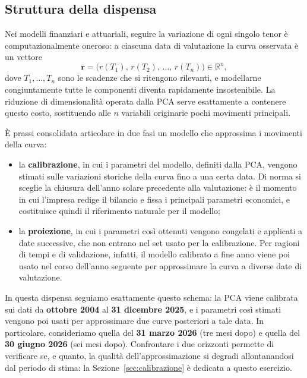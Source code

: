 \documentclass[11pt,a4paper]{article}
\theoremstyle{plain}
\theoremstyle{definition}
\theoremstyle{remark}
\begin{document}


\subsection{Struttura della dispensa}
\label{sec:calibrazione-validazione}

Nei modelli finanziari e attuariali, seguire la variazione di ogni singolo
tenor è computazionalmente oneroso: a ciascuna data di valutazione la curva
osservata è un vettore
\[
  \mathbf{r} = \big(r(T_1),\, r(T_2),\, \ldots,\, r(T_n)\big) \in \mathbb{R}^n,
\]
dove $T_1, \ldots, T_n$ sono le scadenze che si ritengono rilevanti, e
modellarne congiuntamente tutte le componenti diventa rapidamente
insostenibile. La riduzione di dimensionalità operata dalla PCA serve
esattamente a contenere questo costo, sostituendo alle $n$ variabili
originarie pochi movimenti principali.

È prassi consolidata articolare in due fasi un modello che approssima i
movimenti della curva:
\begin{itemize}
  \item la \textbf{calibrazione}, in cui i parametri del modello, definiti dalla PCA, vengono stimati sulle variazioni storiche
        della curva fino a una certa data. Di norma si sceglie la chiusura
        dell'anno solare precedente alla valutazione: è il momento in cui
        l'impresa redige il bilancio e fissa i principali parametri
        economici, e costituisce quindi il riferimento naturale per il
        modello;
  \item la \textbf{proiezione}, in cui i parametri così ottenuti vengono
        congelati e applicati a date successive, che non entrano nel set usato per la calibrazione. 
	Per ragioni di tempi e di validazione, infatti, il
        modello calibrato a fine anno viene poi usato nel corso dell'anno
        seguente per approssimare la curva a diverse date di valutazione.
\end{itemize}

In questa dispensa seguiamo esattamente questo schema: la PCA viene calibrata
sui dati da \textbf{ottobre 2004} al \textbf{31 dicembre 2025}, e i parametri così
stimati vengono poi usati per approssimare due curve posteriori a tale data. 
In particolare, consideriamo
quella del \textbf{31 marzo 2026} (tre mesi dopo) e quella del
\textbf{30 giugno 2026} (sei mesi dopo). Confrontare i due orizzonti permette
di verificare se, e quanto, la qualità dell'approssimazione si degradi
allontanandosi dal periodo di stima: la Sezione~\ref{sec:calibrazione} è
dedicata a questo esercizio.
\end{document}
